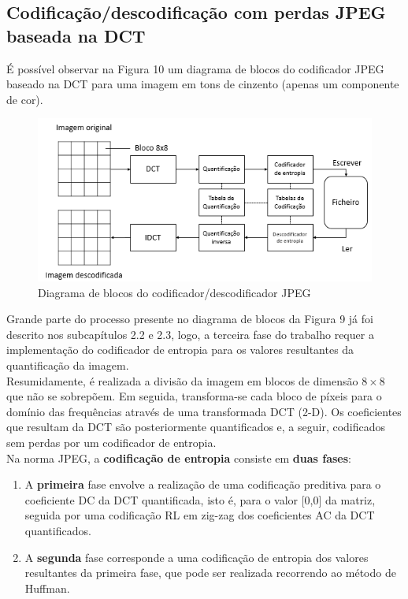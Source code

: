 \documentclass[12pt,a4paper]{article}
\begin{document}
\subsection{Codificação/descodificação com perdas JPEG baseada na DCT}
É possível observar na Figura 10 um diagrama de blocos do codificador JPEG baseado na DCT para uma imagem em tons de cinzento (apenas um componente de cor).

\begin{figure}[h]
\centering
\includegraphics[width=.9\linewidth]{imagens/coddesc.png}
\caption{Diagrama de blocos do codificador/descodificador JPEG}
\end{figure}

Grande parte do processo presente no diagrama de blocos da Figura 9 já foi descrito nos subcapítulos 2.2 e 2.3, logo, a terceira fase do trabalho requer a implementação do codificador de entropia para os valores resultantes da quantificação da imagem.\\
Resumidamente, é realizada a divisão da imagem em blocos de dimensão $8\times 8$ que não se sobrepõem. Em seguida, transforma-se cada bloco de píxeis para o domínio das frequências através de uma transformada DCT (2-D). Os coeficientes que resultam da DCT são posteriormente quantificados e, a seguir, codificados sem perdas por um codificador de entropia.\\
Na norma JPEG, a \textbf{codificação de entropia} consiste em \textbf{duas fases}:

\begin{enumerate}
\item A \textbf{primeira} fase envolve a realização de uma codificação preditiva para o coeficiente DC da DCT quantificada, isto é, para o valor [0,0] da matriz, seguida por uma codificação RL em zig-zag dos coeficientes AC da DCT quantificados.
\item A \textbf{segunda} fase corresponde a uma codificação de entropia dos valores resultantes da primeira fase, que pode ser realizada recorrendo ao método de Huffman.
\end{enumerate}
\end{document}
